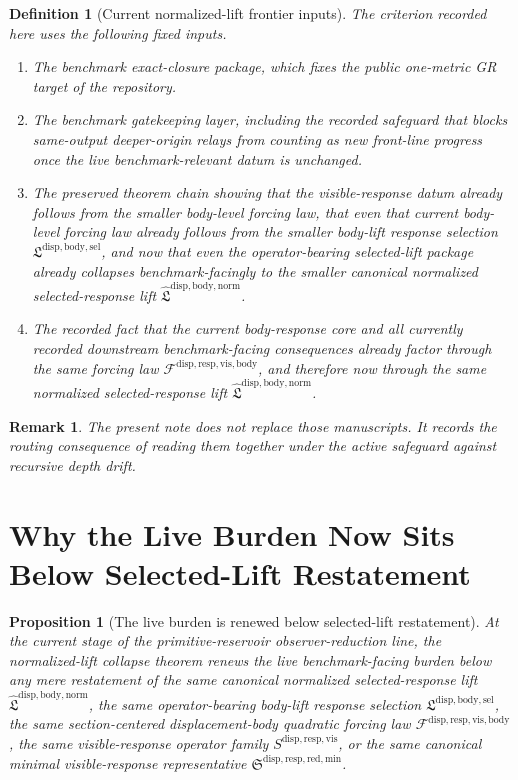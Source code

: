 \documentclass[11pt]{article}
\newcommand{\LiftSelectionPackage}{\mathfrak L^{\mathrm{disp,body,sel}}}
\newcommand{\NormalizedLiftPackage}{\widehat{\mathfrak L}^{\mathrm{disp,body,norm}}}
\newcommand{\VisibleBodyForcingLaw}{\mathscr F^{\mathrm{disp,resp,vis,body}}}
\newcommand{\VisibleResponseOperator}{S^{\mathrm{disp,resp,vis}}}
\newcommand{\MinimalReducedStructure}{\mathfrak S^{\mathrm{disp,resp,red,min}}}
\newtheorem{definition}{Definition}
\newtheorem{proposition}{Proposition}
\newtheorem{remark}{Remark}
\begin{document}
\begin{definition}[Current normalized-lift frontier inputs]
The criterion recorded here uses the following fixed inputs.
\begin{enumerate}
    \item The benchmark exact-closure package, which fixes the public one-metric GR target of the repository.
    \item The benchmark gatekeeping layer, including the recorded safeguard that blocks same-output deeper-origin relays from counting as new front-line progress once the live benchmark-relevant datum is unchanged.
    \item The preserved theorem chain showing that the visible-response datum already follows from the smaller body-level forcing law, that even that current body-level forcing law already follows from the smaller body-lift response selection \(\LiftSelectionPackage\), and now that even the operator-bearing selected-lift package already collapses benchmark-facingly to the smaller canonical normalized selected-response lift \(\NormalizedLiftPackage\).
    \item The recorded fact that the current body-response core and all currently recorded downstream benchmark-facing consequences already factor through the same forcing law \(\VisibleBodyForcingLaw\), and therefore now through the same normalized selected-response lift \(\NormalizedLiftPackage\).
\end{enumerate}
\end{definition}

\begin{remark}
The present note does not replace those manuscripts. It records the routing consequence of reading them together under the active safeguard against recursive depth drift.
\end{remark}

\section{Why the Live Burden Now Sits Below Selected-Lift Restatement}

\begin{proposition}[The live burden is renewed below selected-lift restatement]
At the current stage of the primitive-reservoir observer-reduction line, the normalized-lift collapse theorem renews the live benchmark-facing burden below any mere restatement of the same canonical normalized selected-response lift \(\NormalizedLiftPackage\), the same operator-bearing body-lift response selection \(\LiftSelectionPackage\), the same section-centered displacement-body quadratic forcing law \(\VisibleBodyForcingLaw\), the same visible-response operator family \(\VisibleResponseOperator\), or the same canonical minimal visible-response representative \(\MinimalReducedStructure\).
\end{proposition}
\end{document}
